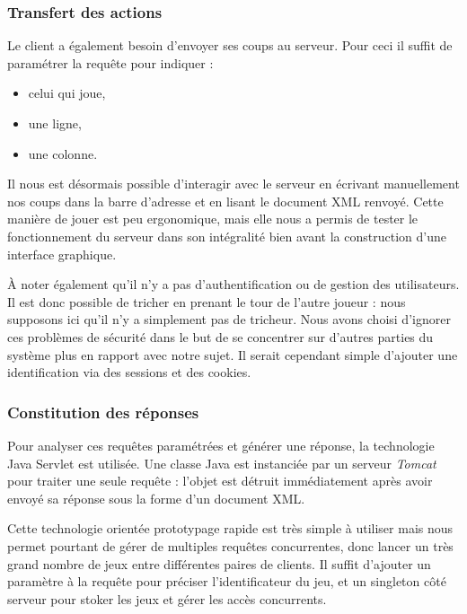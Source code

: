 \subsubsection{Transfert des actions}
Le client a également besoin d'envoyer ses coups au serveur. Pour ceci il suffit de paramétrer la requête pour indiquer :
\begin{itemize}
\item celui qui joue,
\item une ligne,
\item une colonne.
\end{itemize}
Il nous est désormais possible d'interagir avec le serveur en écrivant manuellement nos coups dans la barre d'adresse et en lisant le document XML renvoyé. Cette manière de jouer est peu ergonomique, mais elle nous a permis de tester le fonctionnement du serveur dans son intégralité bien avant la construction d'une interface graphique.

À noter également qu'il n'y a pas d'authentification ou de gestion des utilisateurs. Il est donc possible de \og tricher \fg{} en prenant le tour de l'autre joueur  : nous supposons ici qu'il n'y a simplement pas de tricheur. Nous avons choisi d'ignorer ces problèmes de sécurité dans le but de se concentrer sur d'autres parties du système plus en rapport avec notre sujet. Il serait cependant simple d'ajouter une identification via des sessions et des cookies.
\subsubsection{Constitution des réponses}
Pour analyser ces requêtes paramétrées et générer une réponse, la technologie \og Java Servlet \fg {} est utilisée. Une classe Java est instanciée par un serveur \emph{Tomcat} pour traiter une seule requête : l'objet est détruit immédiatement après avoir envoyé sa réponse sous la forme d'un document XML.

Cette technologie orientée prototypage rapide est très simple à utiliser mais nous permet pourtant de gérer de multiples requêtes concurrentes, donc lancer un très grand nombre de jeux entre différentes paires de clients. Il suffit d'ajouter un paramètre à la requête pour préciser l'identificateur du jeu, et un singleton côté serveur pour stoker les jeux et gérer les accès concurrents.
